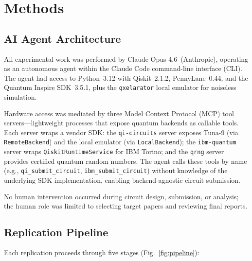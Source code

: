 \documentclass[twocolumn,prl,superscriptaddress,nofootinbib]{revtex4-2}
\begin{document}
\section{Methods}
\label{sec:methods}

\subsection{AI Agent Architecture}

All experimental work was performed by Claude Opus 4.6~(Anthropic), operating as an autonomous agent within the Claude Code command-line interface (CLI).
The agent had access to Python~3.12 with Qiskit~2.1.2, PennyLane~0.44, and the Quantum Inspire SDK~3.5.1, plus the \texttt{qxelarator} local emulator for noiseless simulation.

Hardware access was mediated by three Model Context Protocol (MCP) tool servers---lightweight processes that expose quantum backends as callable tools.
Each server wraps a vendor SDK: the \texttt{qi-circuits} server exposes Tuna-9 (via \texttt{RemoteBackend}) and the local emulator (via \texttt{LocalBackend}); the \texttt{ibm-quantum} server wraps \texttt{QiskitRuntimeService} for IBM Torino; and the \texttt{qrng} server provides certified quantum random numbers.
The agent calls these tools by name (e.g., \texttt{qi\_submit\_circuit}, \texttt{ibm\_submit\_circuit}) without knowledge of the underlying SDK implementation, enabling backend-agnostic circuit submission.

No human intervention occurred during circuit design, submission, or analysis; the human role was limited to selecting target papers and reviewing final reports.

\subsection{Replication Pipeline}

Each replication proceeds through five stages (Fig.~\ref{fig:pipeline}):
\end{document}
